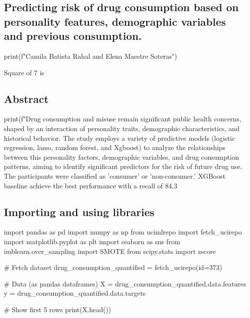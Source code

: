 \documentclass{article}
\begin{document}
\begin{center}
\section*{Predicting risk of drug consumption based on personality features, demographic variables and previous consumption.}
\begin{pycode}
print(f"Camila Batista Rahal and Elena Maestre Soteras")
\end{pycode}
\end{center}


Square of 7 is 

\subsection*{Abstract}
\begin{pycode}
print(f"Drug consumption and misuse remain significant public health concerns, shaped by an interaction of personality traits, demographic characteristics, and historical behavior. The study employs a variety of predictive models (logistic regression, lasso, random forest, and Xgboost) to analyze the relationships between this personality factors, demographic variables, and drug consumption patterns, aiming to identify significant predictors for the risk of future drug use. The participants were classified as 'consumer' or 'non-consumer.' XGBoost baseline achieve the best performance with a recall of 84.3%
\end{pycode}

\subsection*{Importing and using libraries}
\begin{pycode}
import pandas as pd
import numpy as np
from ucimlrepo import fetch_ucirepo
import matplotlib.pyplot as plt
import seaborn as sns
from imblearn.over_sampling import SMOTE
from scipy.stats import zscore

# Fetch dataset
drug_consumption_quantified = fetch_ucirepo(id=373)

# Data (as pandas dataframes)
X = drug_consumption_quantified.data.features
y = drug_consumption_quantified.data.targets

# Show first 5 rows
print(X.head())
\end{pycode}
\end{document}
